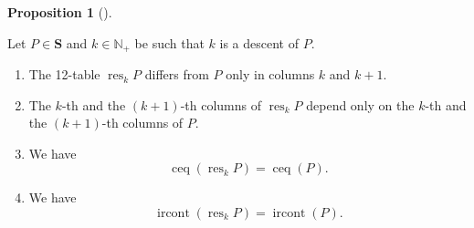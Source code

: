 \documentclass[numbers=enddot,12pt,final,onecolumn,notitlepage]{scrartcl}%
\theoremstyle{definition}
\newtheorem{prop}[theo]{Proposition}
\newenvironment{proposition}[1][]
{\begin{prop}[#1]\begin{leftbar}}
{\end{leftbar}\end{prop}}
\begin{document}
\begin{proposition}
\label{prop.descent-resolution-props}Let $P\in\mathbf{S}$ and $k\in
\mathbb{N}_{+}$ be such that $k$ is a descent of $P$.

\begin{enumerate}
\renewcommand{\theenumi}{\alph{enumi}}
\renewcommand{\labelenumi}{\textbf{(\theenumi)}}

\item \label{pf.lem.BK.res.loc}
The 12-table $\operatorname*{res}\nolimits_{k}P$ differs from $P$
only in columns $k$ and $k+1$.

\item \label{pf.lem.BK.res.loc2}
The $k$-th and the $\left(  k+1\right)  $-th columns of
$\operatorname*{res}\nolimits_{k}P$ depend only on the $k$-th and the $\left(
k+1\right)  $-th columns of $P$.

\item \label{pf.lem.BK.res.ceq}
We have%
\[
\operatorname*{ceq}\left(  \operatorname*{res}\nolimits_{k}P\right)
=\operatorname*{ceq}\left(  P\right) .
\]

\item \label{pf.lem.BK.res.irconts}
We have%
\[
\operatorname*{ircont}\left(  \operatorname*{res}\nolimits_{k}P\right)
=\operatorname*{ircont}\left(  P\right)  .
\]


\end{enumerate}
\end{proposition}
\end{document}
